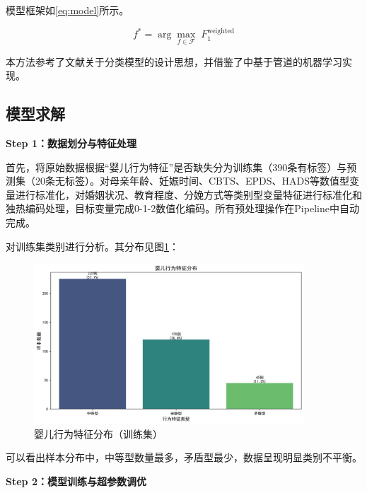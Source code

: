 \documentclass[withoutpreface,bwprint]{cumcmthesis}
\begin{document}
模型框架如\cref{eq:model}所示。

\begin{equation}
\label{eq:model}
f^* = \arg\max_{f\in\mathcal{F}} \; F_1^{\text{weighted}}
\end{equation}



本方法参考了文献\cite{司守奎2011数学建模算法与应用}关于分类模型的设计思想，并借鉴了中基于管道的机器学习实现。

\subsection{模型求解}

\textbf{Step 1：数据划分与特征处理}

首先，将原始数据根据“婴儿行为特征”是否缺失分为训练集（390条有标签）与预测集（20条无标签）。对母亲年龄、妊娠时间、CBTS、EPDS、HADS等数值型变量进行标准化，对婚姻状况、教育程度、分娩方式等类别型变量特征进行标准化和独热编码处理，目标变量完成0-1-2数值化编码。所有预处理操作在Pipeline中自动完成。

对训练集类别进行分析。其分布见图\ref{fig:train-dist}：
\begin{figure}[htbp]
    \centering
    \includegraphics[width=0.9\textwidth]{figures/婴儿行为特征分布.png}
    \caption{婴儿行为特征分布（训练集）}
    \label{fig:train-dist}
\end{figure}
可以看出样本分布中，中等型数量最多，矛盾型最少，数据呈现明显类别不平衡。

\textbf{Step 2：模型训练与超参数调优}
\end{document}
